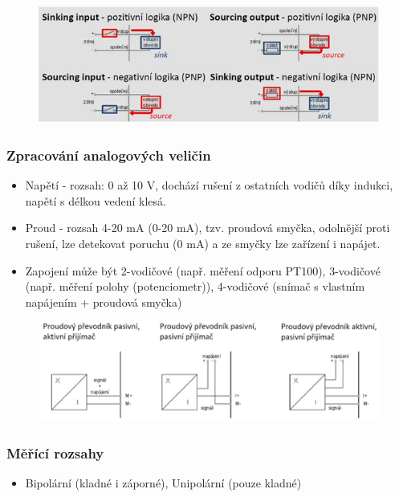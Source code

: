 \begin{figure}[h]
    \begin{center}
        \includegraphics[scale = 1]{img/picture5.png}
    \end{center}
\end{figure}

\subsubsection*{Zpracování analogových veličin}
\begin{itemize}
    \item Napětí - rozsah: 0 až 10 V, dochází rušení z ostatních vodičů díky indukci, napětí s délkou vedení klesá.
    \item Proud - rozsah 4-20 mA (0-20 mA), tzv. proudová smyčka, odolnější proti rušení, lze detekovat poruchu (0 mA) a ze smyčky lze zařízení i napájet.
    \item Zapojení může být 2-vodičové (např. měření odporu PT100), 3-vodičové (např. měření polohy (potenciometr)), 4-vodičové (snímač s vlastním napájením + proudová smyčka)
\end{itemize}

\begin{figure}[h]
    \begin{center}
        \includegraphics[scale = 1]{img/picture4.png}
    \end{center}
\end{figure}

\subsubsection*{Měřící rozsahy}
\begin{itemize}
    \item Bipolární (kladné i záporné), Unipolární (pouze kladné)
\end{itemize}


